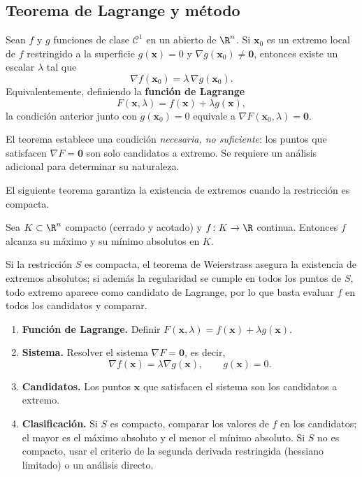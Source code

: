 \subsection{Teorema de Lagrange y método}

\begin{theorem}
Sean $f$ y $g$ funciones de clase $\mathcal C^1$ en un abierto de $\R^n$. Si $\mathbf{x}_0$ es un extremo local de $f$ restringido a la superficie $g(\mathbf{x})=0$ y $\nabla g(\mathbf{x}_0)\neq \mathbf{0}$, entonces existe un escalar $\lambda$ tal que
\[
\nabla f(\mathbf{x}_0) = \lambda\,\nabla g(\mathbf{x}_0).
\]
Equivalentemente, definiendo la \textbf{función de Lagrange}
\[
F(\mathbf{x},\lambda)=f(\mathbf{x})+\lambda g(\mathbf{x}),
\]
la condición anterior junto con $g(\mathbf{x}_0)=0$ equivale a $\nabla F(\mathbf{x}_0,\lambda)=\mathbf{0}$.
\end{theorem}

\begin{rem}
El teorema establece una condición \emph{necesaria, no suficiente}: los puntos que satisfacen $\nabla F=\mathbf{0}$ son solo candidatos a extremo. Se requiere un análisis adicional para determinar su naturaleza.
\end{rem}

El siguiente teorema garantiza la existencia de extremos cuando la restricción es compacta.

\begin{theorem}[Weierstrass]
Sea $K\subset\R^n$ compacto (cerrado y acotado) y $f\colon K\to\R$ continua. Entonces $f$ alcanza su máximo y su mínimo absolutos en $K$.
\end{theorem}

Si la restricción $S$ es compacta, el teorema de Weierstrass asegura la existencia de extremos absolutos; si además la regularidad se cumple en todos los puntos de $S$, todo extremo aparece como candidato de Lagrange, por lo que basta evaluar $f$ en todos los candidatos y comparar.

\begin{pasos}
\begin{enumerate}
    \item \textbf{Función de Lagrange.} Definir $F(\mathbf{x},\lambda)=f(\mathbf{x})+\lambda g(\mathbf{x})$.
    \item \textbf{Sistema.} Resolver el sistema $\nabla F=\mathbf{0}$, es decir,
    \[
    \nabla f(\mathbf{x})=\lambda\nabla g(\mathbf{x}),\qquad g(\mathbf{x})=0.
    \]
    \item \textbf{Candidatos.} Los puntos $\mathbf{x}$ que satisfacen el sistema son los candidatos a extremo.
    \item \textbf{Clasificación.} Si $S$ es compacto, comparar los valores de $f$ en los candidatos; el mayor es el máximo absoluto y el menor el mínimo absoluto. Si $S$ no es compacto, usar el criterio de la segunda derivada restringida (hessiano limitado) o un análisis directo.
\end{enumerate}
\end{pasos}

